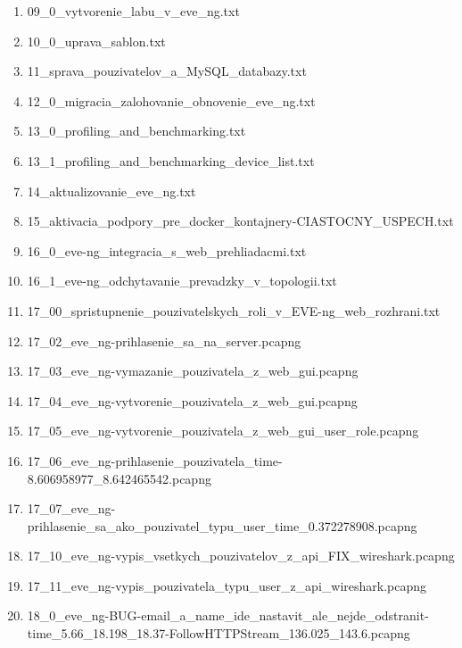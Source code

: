 \begin{enumerate}[noitemsep,label*=\thesection.\arabic*.]
\begin{enumerate}[noitemsep,label*=\arabic*.]
        \item 09\_0\_vytvorenie\_labu\_v\_eve\_ng.txt
        \item \label{item:uprava_sablon} 10\_0\_uprava\_sablon.txt
        \item \label{item:sprava_pouzivatelov_a_databazy} 11\_sprava\_pouzivatelov\_a\_MySQL\_databazy.txt
        \item \label{item:obnova_zalohovanie} 12\_0\_migracia\_zalohovanie\_obnovenie\_eve\_ng.txt
        \item \label{item:benchmarking_popis} 13\_0\_profiling\_and\_benchmarking.txt
        \item \label{item:benchmarking_list} 13\_1\_profiling\_and\_benchmarking\_device\_list.txt
        \item \label{item:aktualizacia_eve_ng} 14\_aktualizovanie\_eve\_ng.txt
        \item 15\_aktivacia\_podpory\_pre\_docker\_kontajnery-CIASTOCNY\_USPECH.txt
        \item \label{item:integracia_s_prehliadacmi} 16\_0\_eve-ng\_integracia\_s\_web\_prehliadacmi.txt
        \item 16\_1\_eve-ng\_odchytavanie\_prevadzky\_v\_topologii.txt
        \item \label{item:spristupnenie_pouzivatelskych_roli} 17\_00\_spristupnenie\_pouzivatelskych\_roli\_v\_EVE-ng\_web\_rozhrani.txt
        \item 17\_02\_eve\_ng-prihlasenie\_sa\_na\_server.pcapng
        \item 17\_03\_eve\_ng-vymazanie\_pouzivatela\_z\_web\_gui.pcapng
        \item 17\_04\_eve\_ng-vytvorenie\_pouzivatela\_z\_web\_gui.pcapng
        \item 17\_05\_eve\_ng-vytvorenie\_pouzivatela\_z\_web\_gui\_user\_role.pcapng
        \item 17\_06\_eve\_ng-prihlasenie\_pouzivatela\_time-8.606958977\_8.642465542.pcapng
        \item 17\_07\_eve\_ng-prihlasenie\_sa\_ako\_pouzivatel\_typu\_user\_time\_0.372278908.pcapng
        \item 17\_10\_eve\_ng-vypis\_vsetkych\_pouzivatelov\_z\_api\_FIX\_wireshark.pcapng
        \item \label{item:spristupnenie_pouzivatelskych_roli_pcap_posledny} 17\_11\_eve\_ng-vypis\_pouzivatela\_typu\_user\_z\_api\_wireshark.pcapng
        \item 18\_0\_eve\_ng-BUG-email\_a\_name\_ide\_nastavit\_ale\_nejde\_odstranit-time\_5.66\_18.198\_18.37-FollowHTTPStream\_136.025\_143.6.pcapng

\end{enumerate}
\end{enumerate}
